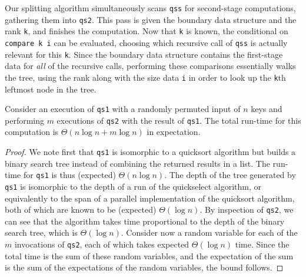 \begin{abstrsyn}
Our splitting algorithm simultaneously scans \texttt{qss} for second-stage
computations, gathering them into \texttt{qs2}. This pass is given the boundary
data structure and the rank \texttt{k}, and finishes the computation. Now that
\texttt{k} is known, the conditional on \texttt{compare k i} can be evaluated,
choosing which recursive call of \texttt{qss} is actually relevant for this
\texttt{k}. Since the boundary data structure contains the first-stage data for
\emph{all} of the recursive calls, performing these comparisons essentially
walks the tree, using the rank along with the size data \texttt{i} in order to
look up the \texttt{k}th leftmost node in the tree.

\begin{theorem*}
  Consider an execution of \texttt{qs1} with a randomly permuted input
  of $n$ keys and performing $m$ executions of \texttt{qs2} with the
  result of \texttt{qs1}.  The total run-time for this computation is
  $\Theta(n\log{n} + m\log{n})$ in expectation.
\end{theorem*}
\begin{proof}
  We note first that \texttt{qs1} is
  isomorphic to a quicksort algorithm but builds a binary search tree
  instead of combining the returned results in a list.  The run-time
  for \texttt{qs1} is thus (expected) $\Theta(n\log{n})$.
%
  The depth of the tree generated by \texttt{qs1} is isomorphic to the
    depth of a run of the quickselect algorithm, or equivalently to the
    span of a parallel implementation of the quicksort algorithm, both
    of which are known to be (expected) $\Theta(\log{n})$.
%
    By inspection of \texttt{qs2}, we can see that the algorithm takes
    time proportional to the depth of the binary search tree, which is
    $\Theta(\log{n})$. Consider now a random variable for each of the
    $m$ invocations of \texttt{qs2}, each of which takes expected
    $\Theta(\log{n})$ time.  Since the total time is the sum of these
    random variables, and the expectation of the sum is the sum of
    the expectations of the random variables, the bound follows.
\end{proof}

\end{abstrsyn}
